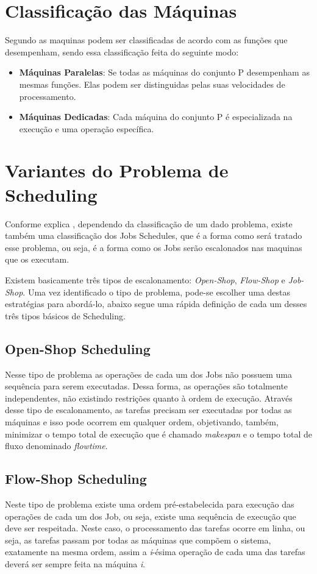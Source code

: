 \section{Classificação das Máquinas}\label{sec:class_maq}
Segundo  as maquinas podem ser classificadas de acordo com as funções que desempenham, sendo essa classificação feita do seguinte modo:

\begin{itemize}
\item {\bf Máquinas Paralelas}: Se todas as máquinas do conjunto P desempenham as mesmas funções. Elas podem ser distinguidas pelas suas velocidades de processamento. 

\item {\bf Máquinas Dedicadas}: Cada máquina do conjunto P é especializada na execução e uma operação específica.
\end{itemize}

\section{Variantes do Problema de Scheduling}\label{sec:Var_Prob}
Conforme explica , dependendo da classificação de um dado problema, existe também uma classificação dos Jobs Schedules, que é a forma como será tratado esse problema, ou seja, é a forma como os Jobs serão escalonados nas maquinas que os executam.

Existem basicamente três tipos de escalonamento: {\it Open-Shop}, {\it Flow-Shop} e {\it Job-Shop}. Uma vez identificado o tipo de problema, pode-se escolher uma destas estratégias para abordá-lo, abaixo segue uma rápida definição de cada um desses três tipos básicos de Scheduling.

\subsection{Open-Shop Scheduling}
Nesse tipo de problema as operações de cada um dos Jobs não possuem uma sequência para serem executadas. Dessa forma, as operações são totalmente independentes, não existindo restrições quanto à ordem de execução.
Através desse tipo de escalonamento, as tarefas precisam ser executadas por todas as máquinas e isso pode ocorrem em qualquer ordem, objetivando, também, minimizar o tempo total de execução que é chamado \textit{makespan} e o tempo total de fluxo denominado \textit{flowtime}.

\subsection{Flow-Shop Scheduling}
Neste tipo de problema existe uma ordem pré-estabelecida para execução das operações de cada um dos Job, ou seja, existe uma sequência de execução que deve ser respeitada. Neste caso, o processamento das tarefas ocorre em linha, ou seja, as tarefas passam por todas as máquinas que compõem o sistema, exatamente na mesma ordem, assim a {\it i}-ésima operação de cada uma das tarefas deverá ser sempre feita na máquina \textit{i}.

